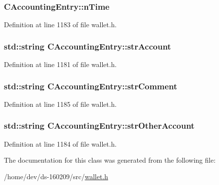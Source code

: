 \hypertarget{class_c_accounting_entry_a416a4eb8d47e4c4cfdfc366d9d777ae6}{}
\subsubsection[{n\+Time}]{ C\+Accounting\+Entry\+::n\+Time}\label{class_c_accounting_entry_a416a4eb8d47e4c4cfdfc366d9d777ae6}


Definition at line 1183 of file wallet.\+h.

\hypertarget{class_c_accounting_entry_a01434c1b0edad576bc1584c9b667ce1d}{}
\subsubsection[{str\+Account}]{\setlength{\rightskip}{0pt plus 5cm}std\+::string C\+Accounting\+Entry\+::str\+Account}\label{class_c_accounting_entry_a01434c1b0edad576bc1584c9b667ce1d}


Definition at line 1181 of file wallet.\+h.

\hypertarget{class_c_accounting_entry_a80c42068f19b13e3201926d340fd10e9}{}
\subsubsection[{str\+Comment}]{\setlength{\rightskip}{0pt plus 5cm}std\+::string C\+Accounting\+Entry\+::str\+Comment}\label{class_c_accounting_entry_a80c42068f19b13e3201926d340fd10e9}


Definition at line 1185 of file wallet.\+h.

\hypertarget{class_c_accounting_entry_a6856c75221e9df5b6a99dda88f45d911}{}
\subsubsection[{str\+Other\+Account}]{\setlength{\rightskip}{0pt plus 5cm}std\+::string C\+Accounting\+Entry\+::str\+Other\+Account}\label{class_c_accounting_entry_a6856c75221e9df5b6a99dda88f45d911}


Definition at line 1184 of file wallet.\+h.



The documentation for this class was generated from the following file\+:\begin{DoxyCompactItemize}
\item 
/home/dev/ds-\/160209/src/\hyperlink{wallet_8h}{wallet.\+h}\end{DoxyCompactItemize}
